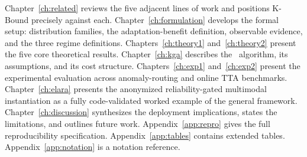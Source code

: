 Chapter~\ref{ch:related} reviews the five adjacent lines of work and
positions K-Bound precisely against each.
Chapter~\ref{ch:formulation} develops the formal setup: distribution
families, the adaptation-benefit definition, observable evidence, and the
three regime definitions.
Chapters~\ref{ch:theory1} and~\ref{ch:theory2} present the five core
theoretical results.
Chapter~\ref{ch:kga} describes the \KGA\ algorithm, its assumptions, and
its cost structure.
Chapters~\ref{ch:exp1} and~\ref{ch:exp2} present the experimental
evaluation across anomaly-routing and online TTA benchmarks.
Chapter~\ref{ch:elara} presents the anonymized reliability-gated multimodal
instantiation as a fully code-validated worked example of the general
framework.
Chapter~\ref{ch:discussion} synthesizes the deployment implications,
states the limitations, and outlines future work.
Appendix~\ref{app:repro} gives the full reproducibility specification.
Appendix~\ref{app:tables} contains extended tables.
Appendix~\ref{app:notation} is a notation reference.
